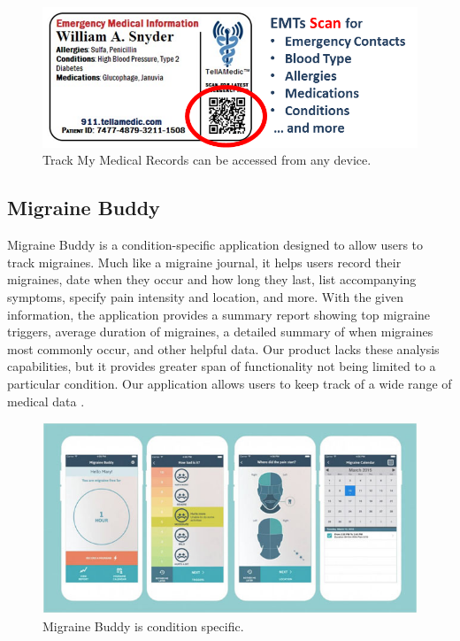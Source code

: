\documentclass[twocolumn,12pt]{article}
\begin{document}
\begin{figure}[!htb] 
	\centering
	\includegraphics[scale=.4]{./490/card-with-words.png}
	\caption{Track My Medical Records can be accessed from any device.}
\end{figure}

\subsection{Migraine Buddy}
Migraine Buddy is a condition-specific application designed to allow users to track migraines. Much like a migraine journal, it helps users record their migraines, date when they occur and how long they last, list accompanying symptoms, specify pain intensity and location, and more. With the given information, the application provides a summary report showing top migraine triggers, average duration of migraines, a detailed summary of when migraines most commonly occur, and other helpful data. Our product lacks these analysis capabilities, but it provides greater span of functionality not being limited to a particular condition. Our application allows users to keep track of a wide range of medical data \cite{migrainebuddy}.

\begin{figure}[!htb] 
	\centering
	\includegraphics[scale=.3]{./490/migrainebuddy.jpg}
	\caption{Migraine Buddy is condition specific.}
\end{figure}
\end{document}
